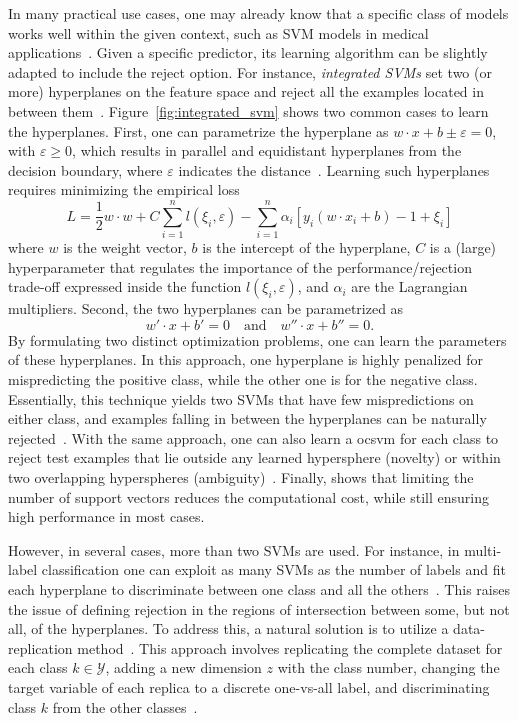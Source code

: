 In many practical use cases, one may already know that a specific class of models works well within the given context, such as SVM models in medical applications~\citep{Hanczar2008,Hamid2017}. Given a specific predictor, its learning algorithm can be slightly adapted to include the reject option. 
For instance, \emph{integrated SVMs} set two (or more) hyperplanes on the feature space and reject all the examples located in between them~\citep{Pillai2011,Lin2018,Zidelmal2012HeartbeatCU}. 
Figure~\ref{fig:integrated_svm} shows two common cases to learn the hyperplanes. First, one can parametrize the hyperplane as $w\cdot x + b \pm \varepsilon = 0$, with $\varepsilon\ge 0$, which results in parallel and equidistant hyperplanes from the decision boundary, where $\varepsilon$ indicates the distance~\citep{Fumera2002}. Learning such hyperplanes requires minimizing the empirical loss
\begin{equation*}
    L = \frac{1}{2} w \cdot w + C \sum_{i=1}^n l(\xi_i, \varepsilon) - \sum_{i=1}^n \alpha_i\left[y_i(w\cdot x_i+b)-1+\xi_i\right]
\end{equation*}
where $w$ is the weight vector, $b$ is the intercept of the hyperplane, $C$ is a (large) hyperparameter that regulates the importance of the performance/rejection trade-off expressed inside the function $l(\xi_i,\varepsilon)$, and $\alpha_i$ are the Lagrangian multipliers. Second, the two hyperplanes can be parametrized as 
\begin{equation*}
    w'\cdot x + b' = 0 \quad \text{and} \quad w''\cdot x + b'' = 0.
\end{equation*}
By formulating two distinct optimization problems, one can learn the parameters of these hyperplanes. In this approach, one hyperplane is highly penalized for mispredicting the positive class, while the other one is for the negative class. Essentially, this technique yields two SVMs that have few mispredictions on either class, and examples falling in between the hyperplanes can be naturally rejected~\citep{Varshney2006}.
With the same approach, one can also learn a \gls{ocsvm} for each class to reject test examples that lie outside any learned hypersphere (novelty) or within two overlapping hyperspheres (ambiguity)~\citep{Lotte2008,Loeffel2015,Wu2007}. Finally, \citet{Sousa2014a} shows that limiting the number of support vectors reduces the computational cost, while still ensuring high performance in most cases.

However, in several cases, more than two SVMs are used. For instance, in multi-label classification one can exploit as many SVMs as the number of labels and fit each hyperplane to discriminate between one class and all the others~\citep{Pillai2011}. This raises the issue of defining rejection in the regions of intersection between some, but not all, of the hyperplanes. To address this, a natural solution is to utilize a data-replication method~\citep{Sousa2009b}. This approach involves replicating the complete dataset for each class $k \in \mathcal{Y}$, adding a new dimension $z$ with the class number, changing the target variable of each replica to a discrete one-vs-all label, and discriminating class $k$ from the other classes~\citep{Cardoso2007,DaRochaNeto2011}.

